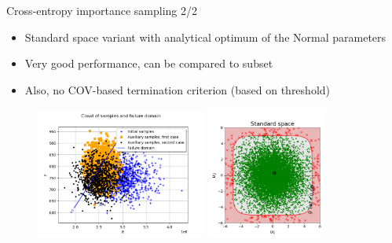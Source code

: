 \documentclass[aspectratio=169]{beamer}
\begin{document}
\begin{frame}{Cross-entropy importance sampling 2/2}

\begin{itemize}
\item Standard space variant with analytical optimum of the Normal parameters
\item Very good performance, can be compared to subset
\item Also, no COV-based termination criterion (based on threshold)
\end{itemize}

\begin{figure}
   \includegraphics[width=0.5\textwidth]{figures/sphx_glr_plot_crossentropy_003}
   \includegraphics[width=0.35\textwidth]{figures/crossads}
\end{figure}

\end{frame}


\end{document}
